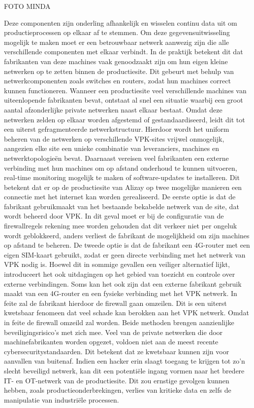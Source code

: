 FOTO MINDA

Deze componenten zijn onderling afhankelijk en wisselen continu data uit om productieprocessen op elkaar af te stemmen. Om deze gegevensuitwisseling mogelijk te maken moet er een betrouwbaar netwerk aanwezig zijn die alle verschillende componenten met elkaar verbindt.
In de praktijk betekent dit dat fabrikanten van deze machines vaak genoodzaakt zijn om hun eigen kleine netwerken op te zetten binnen de productiesite. Dit gebeurt met behulp van netwerkcomponenten zoals switches en routers, zodat hun machines correct kunnen functioneren. Wanneer een productiesite veel verschillende machines van uiteenlopende fabrikanten bevat, ontstaat al snel een situatie waarbij een groot aantal afzonderlijke private netwerken naast elkaar bestaat. Omdat deze netwerken zelden op elkaar worden afgestemd of gestandaardiseerd, leidt dit tot een uiterst gefragmenteerde netwerkstructuur. Hierdoor wordt het uniform beheren van de netwerken op verschillende VPK-sites vrijwel onmogelijk, aangezien elke site een unieke combinatie van leveranciers, machines en netwerktopologieën bevat.
Daarnaast vereisen veel fabrikanten een externe verbinding met hun machines om op afstand onderhoud te kunnen uitvoeren, real-time monitoring mogelijk te maken of software-updates te installeren. Dit betekent dat er op de productiesite van Alizay op twee mogelijke manieren een connectie met het internet kan worden gerealiseerd. De eerste optie is dat de fabrikant gebruikmaakt van het bestaande bekabelde netwerk van de site, dat wordt beheerd door VPK. In dit geval moet er bij de configuratie van de firewallregels rekening mee worden gehouden dat dit verkeer niet per ongeluk wordt geblokkeerd, anders verliest de fabrikant de mogelijkheid om zijn machines op afstand te beheren.
De tweede optie is dat de fabrikant een 4G-router met een eigen SIM-kaart gebruikt, zodat er geen directe verbinding met het netwerk van VPK nodig is. Hoewel dit in sommige gevallen een veiliger alternatief lijkt, introduceert het ook uitdagingen op het gebied van toezicht en controle over externe verbindingen. Soms kan het ook zijn dat een externe fabrikant gebruik maakt van een 4G-router en een fysieke verbinding met het VPK netwerk. In feite zal de fabrikant hierdoor de firewall gaan omzeilen. Dit is een uiterst kwetsbaar fenomeen dat veel schade kan berokken aan het VPK netwerk. Omdat in feite de firewall omzeild zal worden.
Beide methoden brengen aanzienlijke beveiligingsrisico’s met zich mee. Veel van de private netwerken die door machinefabrikanten worden opgezet, voldoen niet aan de meest recente cybersecuritystandaarden. Dit betekent dat ze kwetsbaar kunnen zijn voor aanvallen van buitenaf. Indien een hacker erin slaagt toegang te krijgen tot zo’n slecht beveiligd netwerk, kan dit een potentiële ingang vormen naar het bredere IT- en OT-netwerk van de productiesite. Dit zou ernstige gevolgen kunnen hebben, zoals productieonderbrekingen, verlies van kritieke data en zelfs de manipulatie van industriële processen.




